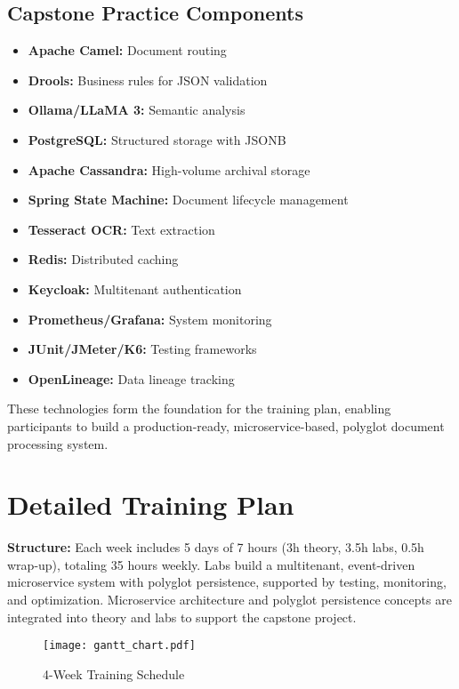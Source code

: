 \documentclass[11pt]{article}
\begin{document}
\subsection{Capstone Practice Components}
\begin{itemize}
    \item \textbf{Apache Camel:} Document routing
    \item \textbf{Drools:} Business rules for JSON validation
    \item \textbf{Ollama/LLaMA 3:} Semantic analysis
    \item \textbf{PostgreSQL:} Structured storage with JSONB
    \item \textbf{Apache Cassandra:} High-volume archival storage
    \item \textbf{Spring State Machine:} Document lifecycle management
    \item \textbf{Tesseract OCR:} Text extraction
    \item \textbf{Redis:} Distributed caching
    \item \textbf{Keycloak:} Multitenant authentication
    \item \textbf{Prometheus/Grafana:} System monitoring
    \item \textbf{JUnit/JMeter/K6:} Testing frameworks
    \item \textbf{OpenLineage:} Data lineage tracking
\end{itemize}

These technologies form the foundation for the training plan, enabling participants to build a production-ready, microservice-based, polyglot document processing system.

\section{Detailed Training Plan}
\textbf{Structure:} Each week includes 5 days of 7 hours (3h theory, 3.5h labs, 0.5h wrap-up), totaling 35 hours weekly. Labs build a multitenant, event-driven microservice system with polyglot persistence, supported by testing, monitoring, and optimization. Microservice architecture and polyglot persistence concepts are integrated into theory and labs to support the capstone project.

\begin{figure}[h]
    \centering
    \texttt{[image: gantt\_chart.pdf]}
    \caption{4-Week Training Schedule}
\end{figure}
\end{document}
